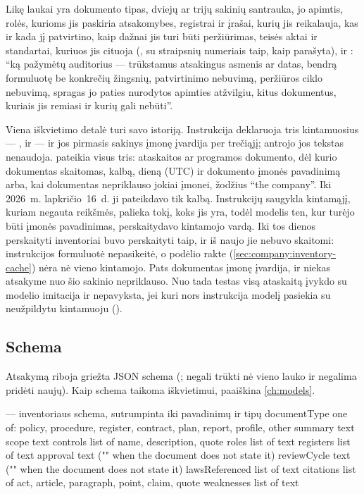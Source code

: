 Likę laukai yra dokumento tipas, dviejų ar trijų sakinių santrauka, jo apimtis, rolės, kurioms
jis paskiria atsakomybes, registrai ir įrašai, kurių jis reikalauja, kas ir kada jį patvirtino,
kaip dažnai jis turi būti peržiūrimas, teisės aktai ir standartai, kuriuos jis cituoja
(, su straipsnių numeriais taip, kaip parašyta), ir :
\enquote{ką pažymėtų auditorius --- trūkstamus atsakingus asmenis ar datas, bendrą formuluotę be
konkrečių žingsnių, patvirtinimo nebuvimą, peržiūros ciklo nebuvimą, spragas jo paties
nurodytos apimties atžvilgiu, kitus dokumentus, kuriais jis remiasi ir kurių gali nebūti}.

Viena iškvietimo detalė turi savo istoriją. Instrukcija deklaruoja tris
kintamuosius --- ,  ir  --- ir jos pirmasis
sakinys įmonę įvardija per trečiąjį; antrojo jos tekstas nenaudoja. 
pateikia visus tris: ataskaitos ar programos dokumento, dėl kurio dokumentas skaitomas, kalbą,
dieną (UTC) ir dokumento įmonės pavadinimą arba, kai dokumentas nepriklauso jokiai įmonei,
žodžius \enquote{the company}. Iki 2026~m. lapkričio~16~d. ji pateikdavo tik kalbą. Instrukcijų saugykla
kintamąjį, kuriam negauta reikšmės, palieka tokį, koks jis yra, todėl modelis ten, kur turėjo
būti įmonės pavadinimas, perskaitydavo kintamojo vardą. Iki tos dienos perskaityti inventoriai
buvo perskaityti taip, ir iš naujo jie nebuvo skaitomi: instrukcijos formuluotė nepasikeitė,
o podėlio rakte (\cref{sec:company:inventory-cache}) nėra nė vieno kintamojo. Pats dokumentas
įmonę įvardija, ir niekas
atsakyme nuo šio sakinio nepriklauso. Nuo tada testas visą ataskaitą įvykdo su modelio imitacija
ir nepavyksta, jei kuri nors instrukcija modelį pasiekia su neužpildytu kintamuoju
().

\subsection{Schema}\label{sec:company:inventory-schema}

Atsakymą riboja griežta JSON schema (; negali trūkti nė vieno lauko ir negalima
pridėti naujų). Kaip schema taikoma iškvietimui, paaiškina \cref{ch:models}.

\begin{codefile}{ --- inventoriaus schema, sutrumpinta iki pavadinimų ir tipų}
documentType    one of: policy, procedure, register, contract, plan, report, profile, other
summary         text
scope           text
controls        list of { name, description, quote }
roles           list of text
registers       list of text
approval        text ("" when the document does not state it)
reviewCycle     text ("" when the document does not state it)
lawsReferenced  list of text
citations       list of { act, article, paragraph, point, claim, quote }
weaknesses      list of text
\end{codefile}

